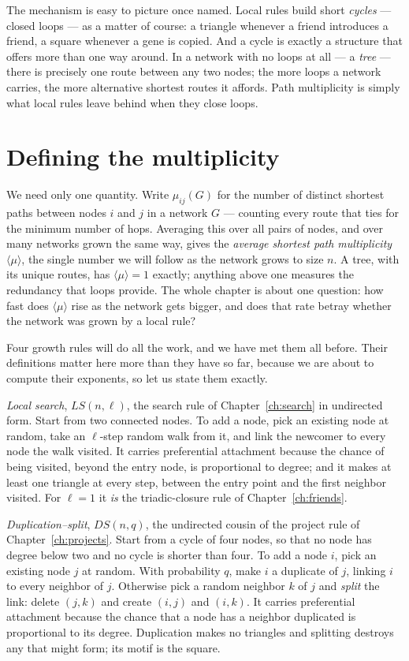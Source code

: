 The mechanism is easy to picture once named. Local rules build short
\emph{cycles} --- closed loops --- as a matter of course: a triangle whenever a
friend introduces a friend, a square whenever a gene is copied. And a cycle is
exactly a structure that offers more than one way around. In a network with no
loops at all --- a \emph{tree} --- there is precisely one route between any two
nodes; the more loops a network carries, the more alternative shortest routes it
affords. Path multiplicity is simply what local rules leave behind when they
close loops.

\section{Defining the multiplicity}

We need only one quantity. Write $\mu_{ij}(G)$ for the number of distinct
shortest paths between nodes $i$ and $j$ in a network $G$ --- counting every route
that ties for the minimum number of hops. Averaging this over all pairs of nodes,
and over many networks grown the same way, gives the \emph{average shortest path
multiplicity} $\langle\mu\rangle$, the single number we will follow as the
network grows to size $n$. A tree, with its unique routes, has $\langle\mu\rangle
= 1$ exactly; anything above one measures the redundancy that loops provide. The
whole chapter is about one question: how fast does $\langle\mu\rangle$ rise as the
network gets bigger, and does that rate betray whether the network was grown by a
local rule?

Four growth rules will do all the work, and we have met them all before. Their
definitions matter here more than they have so far, because we are about to
compute their exponents, so let us state them exactly.

\emph{Local search}, $LS(n,\ell)$, the search rule of Chapter~\ref{ch:search} in
undirected form. Start from two connected nodes. To add a node, pick an existing
node at random, take an $\ell$-step random walk from it, and link the newcomer to
every node the walk visited. It carries preferential attachment because the chance
of being visited, beyond the entry node, is proportional to degree; and it makes at
least one triangle at every step, between the entry point and the first neighbor
visited. For $\ell=1$ it \emph{is} the triadic-closure rule of
Chapter~\ref{ch:friends}.

\emph{Duplication--split}, $DS(n,q)$, the undirected cousin of the project rule of
Chapter~\ref{ch:projects}. Start from a cycle of four nodes, so that no node has
degree below two and no cycle is shorter than four. To add a node $i$, pick an
existing node $j$ at random. With probability $q$, make $i$ a duplicate of $j$,
linking $i$ to every neighbor of $j$. Otherwise pick a random neighbor $k$ of $j$
and \emph{split} the link: delete $(j,k)$ and create $(i,j)$ and $(i,k)$. It
carries preferential attachment because the chance that a node has a neighbor
duplicated is proportional to its degree. Duplication makes no triangles and
splitting destroys any that might form; its motif is the square.

